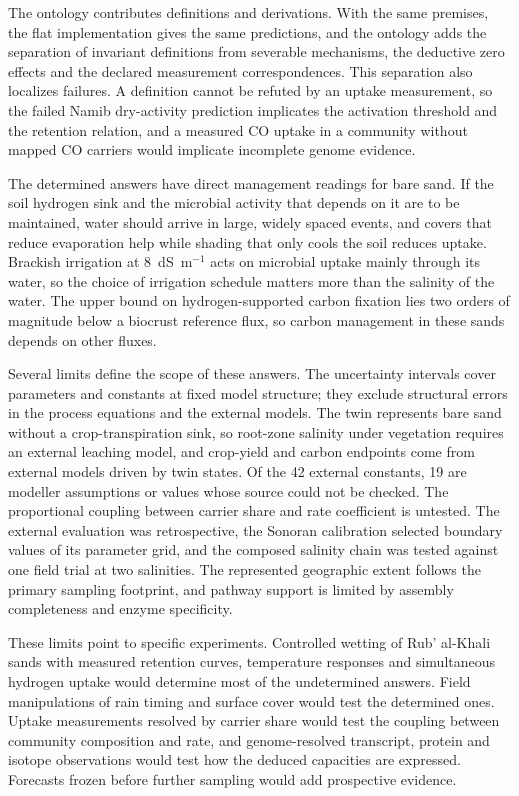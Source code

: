 \documentclass[11pt,a4paper]{article}
\begin{document}
The ontology contributes definitions and derivations. With the same premises, the flat implementation gives the same predictions, and the ontology adds the separation of invariant definitions from severable mechanisms, the deductive zero effects and the declared measurement correspondences. This separation also localizes failures. A definition cannot be refuted by an uptake measurement, so the failed Namib dry-activity prediction implicates the activation threshold and the retention relation, and a measured CO uptake in a community without mapped CO carriers would implicate incomplete genome evidence.

The determined answers have direct management readings for bare sand. If the soil hydrogen sink and the microbial activity that depends on it are to be maintained, water should arrive in large, widely spaced events, and covers that reduce evaporation help while shading that only cools the soil reduces uptake. Brackish irrigation at 8~dS~m$^{-1}$ acts on microbial uptake mainly through its water, so the choice of irrigation schedule matters more than the salinity of the water. The upper bound on hydrogen-supported carbon fixation lies two orders of magnitude below a biocrust reference flux, so carbon management in these sands depends on other fluxes.

Several limits define the scope of these answers. The uncertainty intervals cover parameters and constants at fixed model structure; they exclude structural errors in the process equations and the external models. The twin represents bare sand without a crop-transpiration sink, so root-zone salinity under vegetation requires an external leaching model, and crop-yield and carbon endpoints come from external models driven by twin states. Of the 42 external constants, 19 are modeller assumptions or values whose source could not be checked. The proportional coupling between carrier share and rate coefficient is untested. The external evaluation was retrospective, the Sonoran calibration selected boundary values of its parameter grid, and the composed salinity chain was tested against one field trial at two salinities. The represented geographic extent follows the primary sampling footprint, and pathway support is limited by assembly completeness and enzyme specificity.

These limits point to specific experiments. Controlled wetting of Rub' al-Khali sands with measured retention curves, temperature responses and simultaneous hydrogen uptake would determine most of the undetermined answers. Field manipulations of rain timing and surface cover would test the determined ones. Uptake measurements resolved by carrier share would test the coupling between community composition and rate, and genome-resolved transcript, protein and isotope observations would test how the deduced capacities are expressed. Forecasts frozen before further sampling would add prospective evidence.
\end{document}
